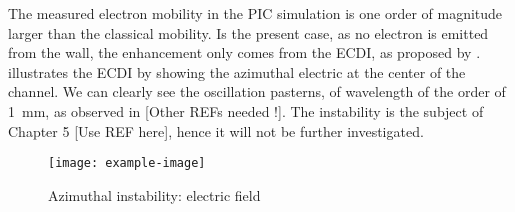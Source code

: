   The measured electron mobility in the \ac{PIC} simulation is one order of magnitude larger than the classical mobility.
  Is the present case, as no electron is emitted from the wall, the enhancement only comes from the \ac{ECDI}, as proposed by \citet{lafleur2016} .
   illustrates the \ac{ECDI} by showing the azimuthal electric at the center of the channel.
  We can clearly see the oscillation pasterns, of wavelength of the order of 1~mm, as observed in \citet{heron2013,janhunen2018} [Other REFs needed !].
  The instability is the subject of Chapter 5 [Use REF here], hence it will not be further investigated.
  
  
  \begin{figure}[hbtp]
    \centering
    \texttt{[image: example-image]}
    \caption{Azimuthal instability: electric field }
    \label{fig-exampleECDI}
  \end{figure}

  
  